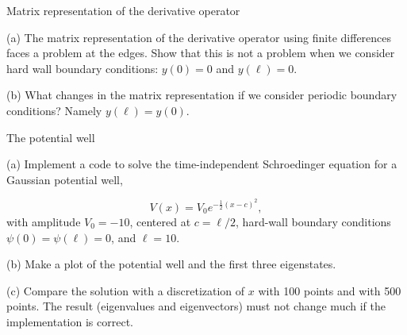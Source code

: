 \begin{problem}{Matrix representation of the derivative operator}
 
 (a) The matrix representation of the derivative operator using finite differences faces a problem at the edges. Show that this is not a problem when we consider hard wall boundary conditions: $y(0) = 0$ and $y(\ell) = 0$.
 
 (b) What changes in the matrix representation if we consider periodic boundary conditions? Namely $y(\ell) = y(0)$.
 
\end{problem}


\begin{problem}{The potential well}

  (a) Implement a code to solve the time-independent Schroedinger equation for a Gaussian potential well,
  
  \begin{equation}
   V(x) = V_0 e^{-\frac{1}{2}(x-c)^2},
  \end{equation}
  with amplitude $V_0 = -10$, centered at $c = \ell/2$, hard-wall boundary conditions $\psi(0) = \psi(\ell) = 0$, and $\ell = 10$.
  
  (b) Make a plot of the potential well and the first three eigenstates.
  
  (c) Compare the solution with a discretization of $x$ with 100 points and with 500 points. The result (eigenvalues and eigenvectors) must not change much if the implementation is correct.
 
\end{problem}






